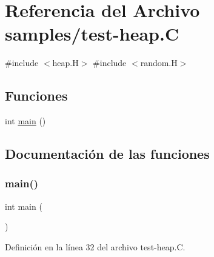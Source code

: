 \hypertarget{test-heap_8_c}{}\section{Referencia del Archivo samples/test-\/heap.C}
\label{test-heap_8_c}
{\ttfamily \#include $<$heap.\+H$>$}\newline
{\ttfamily \#include $<$random.\+H$>$}\newline
\subsection*{Funciones}
\begin{DoxyCompactItemize}
\item 
int \hyperlink{test-heap_8_c_ae66f6b31b5ad750f1fe042a706a4e3d4}{main} ()
\end{DoxyCompactItemize}


\subsection{Documentación de las funciones}
\mbox{\label{test-heap_8_c_ae66f6b31b5ad750f1fe042a706a4e3d4}} 
\subsubsection{\texorpdfstring{main()}{main()}}
{\footnotesize\ttfamily int main (\begin{DoxyParamCaption}{ }\end{DoxyParamCaption})}



Definición en la línea 32 del archivo test-\/heap.\+C.

